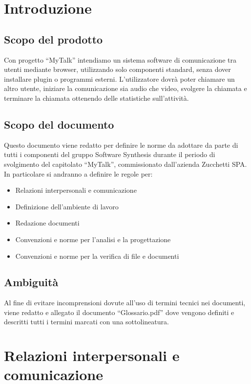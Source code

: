 

\setcounter{page}{1}
\pagestyle{normal}

\newpage
\section{Introduzione}
\subsection{Scopo del prodotto}
Con progetto ``MyTalk'' intendiamo un sistema software di comunicazione tra utenti mediante browser, utilizzando solo componenti standard, senza dover installare plugin o programmi esterni. L'utilizzatore dovrà poter chiamare un altro utente, iniziare la comunicazione sia audio che video, svolgere la chiamata e terminare la chiamata ottenendo delle statistiche sull'attività.

\subsection{Scopo del documento}
Questo documento viene redatto per definire le norme da adottare da parte di tutti i componenti del gruppo Software Synthesis durante il periodo di svolgimento del capitolato ``MyTalk'', commissionato dall'azienda Zucchetti SPA. In particolare si andranno a definire le regole per:
\begin{itemize}
\item Relazioni interpersonali e comunicazione
\item Definizione dell'ambiente di lavoro
\item Redazione documenti
\item Convenzioni e norme per l'analisi e la progettazione
\item Convenzioni e norme per la verifica di file e documenti
\end{itemize}

\subsection{Ambiguità}
Al fine di evitare incomprensioni dovute all'uso di termini tecnici nei documenti, viene redatto e allegato il documento ``Glossario.pdf'' dove vengono definiti e descritti tutti i termini marcati con una sottolineatura.

\newpage
\section{Relazioni interpersonali e comunicazione}
